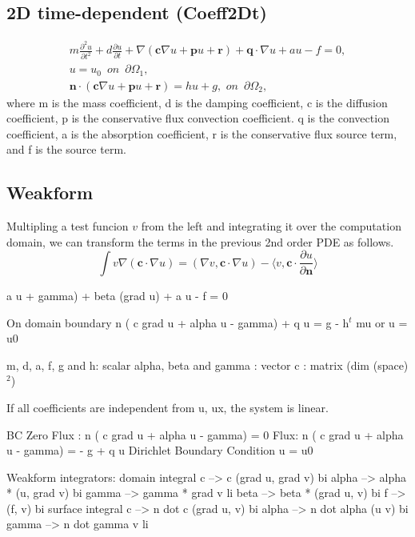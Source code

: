 \documentclass[11pt,a4paper,final]{report}
\begin{document}
  \subsection{2D time-dependent (Coeff2Dt)}
  \begin{align}
  m\frac{\partial^2 u}{\partial t^2} +   d\frac{\partial u}{\partial t} + \nabla (\mathbf{c} \nabla u + \mathbf{p}u + \mathbf{r}) + \mathbf{q} \cdot \nabla u + au - f = 0, 
  \\  
  u = u_{0} \,\,\,on\,\,\,\partial \Omega_{1},
  \\
 \mathbf{n}\cdot (\mathbf{c} \nabla u + \mathbf{p}u + \mathbf{r}) = hu + g,\,\,on\,\,\,\partial \Omega_{2},
  \end{align}
where m is the mass coefficient, d is the damping coefficient, c is the diffusion coefficient, p is the conservative flux convection coefficient. q is the convection coefficient,  a is the absorption coefficient, r is the conservative flux source term, and f is the source term.

 \subsection{Weakform}
  Multipling a test funcion $v$ from the left and integrating it over the computation domain,  we can transform the terms in the previous 2nd order PDE as follows.
  \begin{equation}
 \int v \nabla (\mathbf{c} \cdot \nabla u) = (\nabla v,\mathbf{c} \cdot \nabla u) - \langle v, \mathbf{c} \cdot \frac{\partial u}{\partial \mathbf{n}} \rangle
  \end{equation}
  
  a u + gamma) 
              + beta (grad u) + a u - f = 0

  On domain boundary
     n ( c grad u + alpha u - gamma) + q u = g - h$^t$ mu
       or 
     u = u0  

    m, d, a, f, g and h: scalar
    alpha, beta and gamma : vector
    c  : matrix (dim (space) $^2$)

    If all coefficients are independent from u, ux,
    the system is linear.

    BC
     Zero Flux : 
        n ( c grad u + alpha u - gamma) = 0
     Flux: 
        n ( c grad u + alpha u - gamma) = - g + q u
     Dirichlet Boundary Condition
        u = u0

  Weakform integrators:
    domain integral
       c     -->  c (grad u, grad v)     bi
       alpha -->  alpha * (u, grad v)    bi
       gamma -->  gamma * grad v         li
       beta  -->  beta * (grad u, v)     bi
       f     -->  (f, v)                 bi
    surface integral
       c     -->   n dot c (grad u, v)   bi
       alpha -->   n dot alpha  (u v)    bi
       gamma -->   n dot gamma   v       li
 
\end{document}

